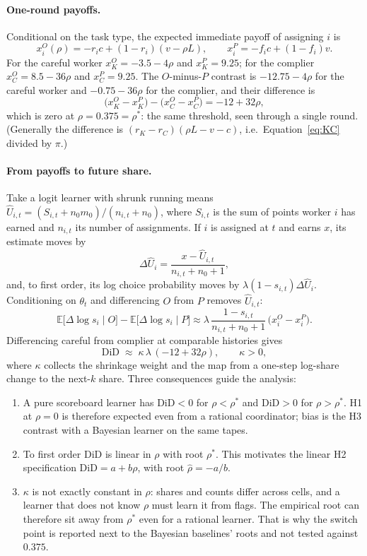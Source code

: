 \documentclass[11pt,letterpaper]{article}
\newcommand{\rhostar}{\rho^{*}}
\newcommand{\did}{\mathrm{DiD}}
\numberwithin{equation}{section}
\numberwithin{table}{section}
\numberwithin{figure}{section}
\numberwithin{algorithm}{section}
\begin{document}
\paragraph{One-round payoffs.} Conditional on the task type, the expected immediate payoff of assigning $i$ is
\[
x_i^O(\rho)=-r_ic+(1-r_i)(v-\rho L),\qquad x_i^P=-f_ic+(1-f_i)v.
\]
For the careful worker $x_K^O=-3.5-4\rho$ and $x_K^P=9.25$; for the complier $x_C^O=8.5-36\rho$ and $x_C^P=9.25$. The $O$-minus-$P$ contrast is $-12.75-4\rho$ for the careful worker and $-0.75-36\rho$ for the complier, and their difference is
\begin{equation}\label{eq:gap}
\bigl(x_K^O-x_K^P\bigr)-\bigl(x_C^O-x_C^P\bigr)=-12+32\rho,
\end{equation}
which is zero at $\rho=0.375=\rhostar$: the same threshold, seen through a single round. (Generally the difference is $(r_K-r_C)(\rho L-v-c)$, i.e.\ Equation~\eqref{eq:KC} divided by $\pi$.)

\paragraph{From payoffs to future share.} Take a logit learner with shrunk running means $\hat U_{i,t}=(S_{i,t}+n_0m_0)/(n_{i,t}+n_0)$, where $S_{i,t}$ is the sum of points worker $i$ has earned and $n_{i,t}$ its number of assignments. If $i$ is assigned at $t$ and earns $x$, its estimate moves by
\[
\Delta\hat U_i=\frac{x-\hat U_{i,t}}{n_{i,t}+n_0+1},
\]
and, to first order, its log choice probability moves by $\lambda(1-s_{i,t})\Delta\hat U_i$. Conditioning on $\theta_t$ and differencing $O$ from $P$ removes $\hat U_{i,t}$:
\[
\mathbb E\bigl[\Delta\log s_i\mid O\bigr]-\mathbb E\bigl[\Delta\log s_i\mid P\bigr]\approx\lambda\,\frac{1-s_{i,t}}{n_{i,t}+n_0+1}\,\bigl(x_i^O-x_i^P\bigr).
\]
Differencing careful from complier at comparable histories gives
\begin{equation}\label{eq:didlin}
\did\;\approx\;\kappa\,\lambda\,(-12+32\rho),\qquad\kappa>0,
\end{equation}
where $\kappa$ collects the shrinkage weight and the map from a one-step log-share change to the next-$k$ share. Three consequences guide the analysis:
\begin{enumerate}
  \item A pure scoreboard learner has $\did<0$ for $\rho<\rhostar$ and $\did>0$ for $\rho>\rhostar$. H1 at $\rho=0$ is therefore expected even from a rational coordinator; bias is the H3 contrast with a Bayesian learner on the same tapes.
  \item To first order $\did$ is linear in $\rho$ with root $\rhostar$. This motivates the linear H2 specification $\did=a+b\rho$, with root $\hat\rho=-a/b$.
  \item $\kappa$ is not exactly constant in $\rho$: shares and counts differ across cells, and a learner that does not know $\rho$ must learn it from flags. The empirical root can therefore sit away from $\rhostar$ even for a rational learner. That is why the switch point is reported next to the Bayesian baselines' roots and not tested against $0.375$.
\end{enumerate}
\end{document}
